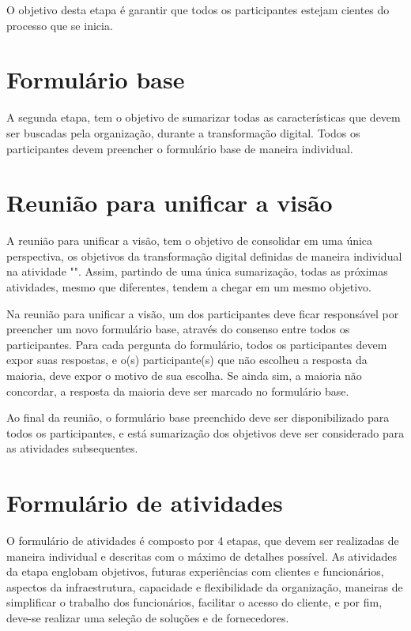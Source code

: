 O objetivo desta etapa é garantir que todos os participantes estejam cientes do processo que se inicia.



\section{Formulário base}\label{sec:atividadeFormBase}

A segunda etapa, tem o objetivo de sumarizar todas as características que devem ser buscadas pela organização, durante a transformação digital. Todos os participantes devem preencher o formulário base de maneira individual.



\section{Reunião para unificar a visão}

A reunião para unificar a visão, tem o objetivo de consolidar em uma única perspectiva, os objetivos da transformação digital definidas de maneira individual na atividade "". Assim, partindo de uma única sumarização, todas as próximas atividades, mesmo que diferentes, tendem a chegar em um mesmo objetivo.

Na reunião para unificar a visão, um dos participantes deve ficar responsável por preencher um novo formulário base, através do consenso entre todos os participantes. Para cada pergunta do formulário, todos os participantes devem expor suas respostas, e o(s) participante(s) que não escolheu a resposta da maioria, deve expor o motivo de sua escolha. Se ainda sim, a maioria não concordar, a resposta da maioria deve ser marcado no formulário base.

Ao final da reunião, o formulário base preenchido deve ser disponibilizado para todos os participantes, e está sumarização dos objetivos deve ser considerado para as atividades subsequentes.


\section{Formulário de atividades}\label{sec:formAtividade}

O formulário de atividades é composto por 4 etapas, que devem ser realizadas de maneira individual e descritas com o máximo de detalhes possível. As atividades da etapa englobam objetivos, futuras experiências com clientes e funcionários, aspectos da infraestrutura, capacidade e flexibilidade da organização, maneiras de simplificar o trabalho dos funcionários, facilitar o acesso do cliente, e por fim, deve-se realizar uma seleção de soluções e de fornecedores.

